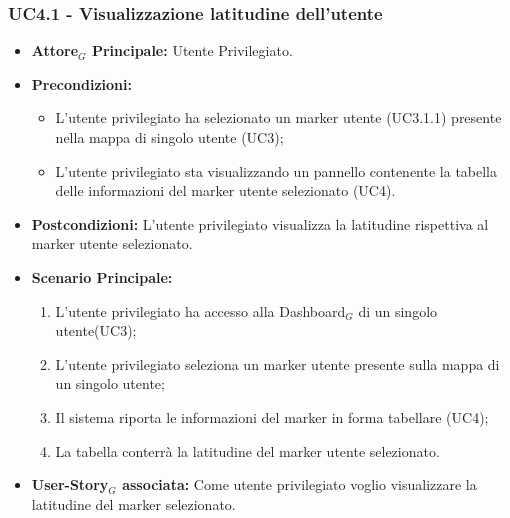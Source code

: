 \documentclass[11pt]{article}
\begin{document}
\begin{justify}
\subsubsection{\textbf{UC4.1 - Visualizzazione latitudine dell'utente}}
\label{UC4.1}
\begin{itemize}
     \item \textbf{Attore$_G$ Principale:} Utente Privilegiato.
     \item \textbf{Precondizioni:}
        \begin{itemize}
          \item L'utente privilegiato ha selezionato un marker utente (UC3.1.1) presente nella mappa di singolo utente (UC3);
          \item L'utente privilegiato sta visualizzando un pannello contenente la tabella delle informazioni del marker utente selezionato (UC4).
        \end{itemize}
      \item \textbf{Postcondizioni:} L'utente privilegiato visualizza la latitudine rispettiva al marker utente selezionato. 
      \item \textbf{Scenario Principale:}
        \begin{enumerate}
            \item L'utente privilegiato ha accesso alla Dashboard$_G$ di un singolo utente(UC3);
            \item L'utente privilegiato seleziona un marker utente presente sulla mappa di un singolo utente;
            \item Il sistema riporta le informazioni del marker in forma tabellare (UC4);
            \item La tabella conterrà la latitudine del marker utente selezionato.
        \end{enumerate}
     \item \textbf{User-Story$_G$ associata:}
       Come utente privilegiato voglio visualizzare la latitudine del marker selezionato.
\end{itemize}


\end{justify}
\end{document}
